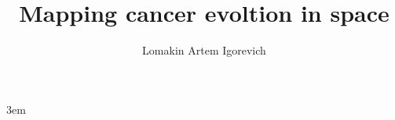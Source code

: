 \documentclass[english, twoside, titlepage, DIV=8, BCOR=8.5mm, open=right, chapterprefix=false]{scrbook}
\title{Mapping cancer evoltion in space}
\author{Lomakin Artem Igorevich}
\begin{document}
\emergencystretch 3em %

\maketitle
\frontmatter
\tableofcontents
\listofabbrev

\mainmatter








\appendix
\listofreferences
\end{document}
